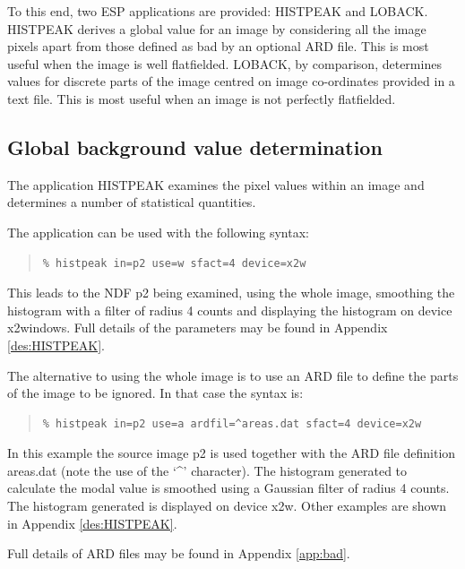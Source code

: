 \documentclass[twoside,11pt]{article}
\newcommand{\xlabel}[1]{}
\newenvironment{myquote}{\begin{quote}\begin{small}}{\end{small}\end{quote}}
\begin{document}
To this end, two ESP applications are provided: HISTPEAK and LOBACK.
HISTPEAK derives a global value for an image by considering all the
image pixels apart from those defined as bad by an optional ARD
file. This is most useful when the image is well flatfielded. LOBACK,
by comparison, determines values for discrete parts of the image
centred on image co-ordinates provided in a text file. This is most
useful when an image is not perfectly flatfielded.

\subsection{Global background value determination}
\xlabel{GLOBALBACKGROUNDS}

The application HISTPEAK examines the pixel values within an image
and determines a number of statistical quantities.

The application can be used with the following syntax:

\begin{myquote}
\begin{verbatim}
% histpeak in=p2 use=w sfact=4 device=x2w
\end{verbatim}
\end{myquote}

This leads to the NDF p2 being examined, using the whole image, smoothing
the histogram with a filter of radius 4 counts and displaying the histogram on
device x2windows. Full details of the parameters may be found in Appendix
\ref{des:HISTPEAK}.

The alternative to using the whole image is to use an ARD file to define the
parts of the image to be ignored. In that case the syntax is:

\begin{myquote}
\begin{verbatim}
% histpeak in=p2 use=a ardfil=^areas.dat sfact=4 device=x2w
\end{verbatim}
\end{myquote}

In this example the source image p2 is used together with the
ARD file definition areas.dat (note the use of the `\^{ }' character).
The histogram generated to
calculate the modal value is smoothed using a Gaussian filter
of radius 4 counts. The histogram generated is displayed on
device x2w. Other examples are shown in Appendix \ref{des:HISTPEAK}.

Full details of ARD files may be found in Appendix \ref{app:bad}.
\end{document}
